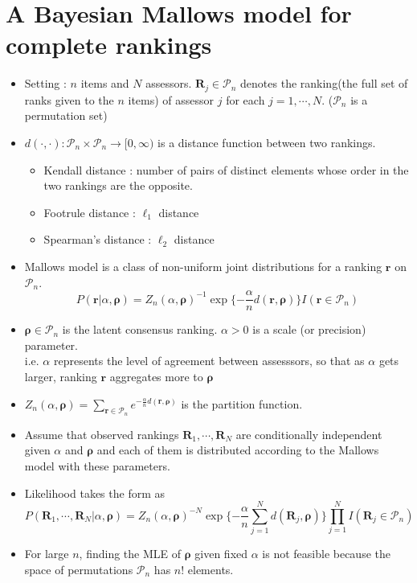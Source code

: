 \documentclass[12pt]{article}
\begin{document}
\section{A Bayesian Mallows model for complete rankings}
\begin{itemize}
    \item Setting : $n$ items and $N$ assessors. $\mathbf{R}_j\in \mathcal{P}_n$ denotes the ranking(the full set of ranks given to the $n$ items) of assessor $j$ for each $j=1,\cdots, N$. ($\mathcal{P}_n$ is a permutation set)
    \item $d(\cdot, \cdot): \mathcal{P}_n\times \mathcal{P}_n\rightarrow [0,\infty)$ is a distance function between two rankings.
    \begin{itemize}
        \item Kendall distance : number of pairs of distinct elements whose order in the two rankings are the opposite.
        \item Footrule distance : $\ell_1$ distance
        \item Spearman's distance : $\ell_2$ distance 
    \end{itemize}
    \item Mallows model is a class of non-uniform joint distributions for a ranking $\mathbf{r}$ on $\mathcal{P}_n$. $$P(\mathbf{r}|\alpha, \boldsymbol{\rho})=Z_n(\alpha, \boldsymbol{\rho})^{-1}\exp\{-\frac{\alpha}{n}d(\mathbf{r}, \boldsymbol{\rho})\}I(\mathbf{r}\in \mathcal{P}_n) $$
    \item $\boldsymbol{\rho}\in \mathcal{P}_n$ is the latent consensus ranking. $\alpha>0$ is a scale (or precision) parameter. \\i.e. $\alpha$ represents the level of agreement between assesssors, so that as $\alpha$ gets larger, ranking $\mathbf{r}$ aggregates more to $\boldsymbol{\rho}$ 
    \item $Z_n(\alpha, \boldsymbol{\rho})=\sum_{\mathbf{r}\in \mathcal{P}_n}e^{-\frac{\alpha}{n}d(\mathbf{r},\boldsymbol{\rho})}$ is the partition function.
    \item Assume that observed rankings $\mathbf{R}_1, \cdots, \mathbf{R}_N$ are conditionally independent given $\alpha$ and $\boldsymbol{\rho}$ and each of them is distributed according to the Mallows model with these parameters.
    \item Likelihood takes the form as \begin{equation}P(\mathbf{R}_1, \cdots, \mathbf{R}_N|\alpha, \boldsymbol{\rho})= Z_n(\alpha, \boldsymbol{\rho})^{-N}\exp\{-\frac{\alpha}{n}\sum_{j=1}^N d(\mathbf{R}_j, \boldsymbol{\rho})\}\prod_{j=1}^N I(\mathbf{R}_j\in \mathcal{P}_n) \end{equation}
    \item For large $n$, finding the MLE of $\boldsymbol{\rho}$ given fixed $\alpha$ is not feasible because the space of permutations $\mathcal{P}_n$ has $n!$ elements. 
\end{itemize}
\end{document}
